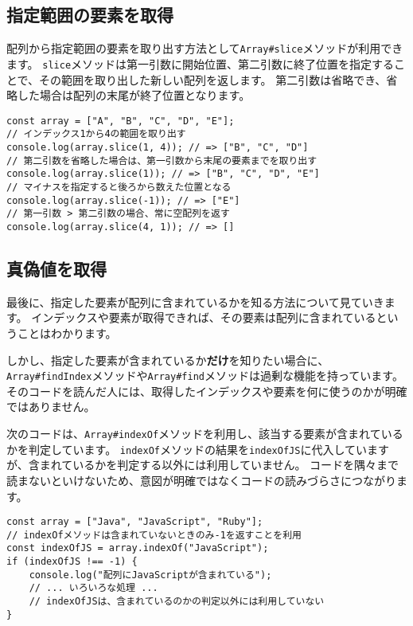 \hypertarget{slice}{%
\subsection{指定範囲の要素を取得}\label{slice}}

配列から指定範囲の要素を取り出す方法として\texttt{Array\#slice}メソッドが利用できます。
\texttt{slice}メソッドは第一引数に開始位置、第二引数に終了位置を指定することで、その範囲を取り出した新しい配列を返します。
第二引数は省略でき、省略した場合は配列の末尾が終了位置となります。

\begin{lstlisting}
const array = ["A", "B", "C", "D", "E"];
// インデックス1から4の範囲を取り出す
console.log(array.slice(1, 4)); // => ["B", "C", "D"]
// 第二引数を省略した場合は、第一引数から末尾の要素までを取り出す
console.log(array.slice(1)); // => ["B", "C", "D", "E"]
// マイナスを指定すると後ろから数えた位置となる
console.log(array.slice(-1)); // => ["E"]
// 第一引数 > 第二引数の場合、常に空配列を返す
console.log(array.slice(4, 1)); // => []
\end{lstlisting}

\hypertarget{get-boolean}{%
\subsection{真偽値を取得}\label{get-boolean}}

最後に、指定した要素が配列に含まれているかを知る方法について見ていきます。
インデックスや要素が取得できれば、その要素は配列に含まれているということはわかります。

しかし、指定した要素が含まれているか\textbf{だけ}を知りたい場合に、
\texttt{Array\#findIndex}メソッドや\texttt{Array\#find}メソッドは過剰な機能を持っています。
そのコードを読んだ人には、取得したインデックスや要素を何に使うのかが明確ではありません。

次のコードは、\texttt{Array\#indexOf}メソッドを利用し、該当する要素が含まれているかを判定しています。
\texttt{indexOf}メソッドの結果を\texttt{indexOfJS}に代入していますが、含まれているかを判定する以外には利用していません。
コードを隅々まで読まないといけないため、意図が明確ではなくコードの読みづらさにつながります。

\begin{lstlisting}
const array = ["Java", "JavaScript", "Ruby"];
// indexOfメソッドは含まれていないときのみ-1を返すことを利用
const indexOfJS = array.indexOf("JavaScript");
if (indexOfJS !== -1) {
    console.log("配列にJavaScriptが含まれている");
    // ... いろいろな処理 ...
    // indexOfJSは、含まれているのかの判定以外には利用していない
}
\end{lstlisting}

